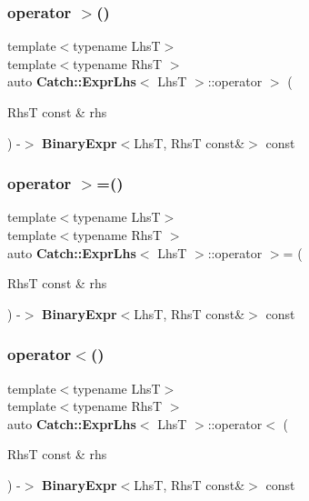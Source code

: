 \mbox{\label{class_catch_1_1_expr_lhs_af4f6dc7eeac031cfdc4fd4b78517e5b8}} 
\subsubsection{operator $>$()}
{\footnotesize\ttfamily template$<$typename LhsT$>$ \\
template$<$typename RhsT $>$ \\
auto \textbf{ Catch\+::\+Expr\+Lhs}$<$ LhsT $>$\+::operator $>$ (\begin{DoxyParamCaption}\item[{RhsT const \&}]{rhs }\end{DoxyParamCaption}) -\/$>$ \textbf{ Binary\+Expr}$<$LhsT, RhsT const\&$>$ const \hspace{0.3cm}{\ttfamily [inline]}}

\mbox{\label{class_catch_1_1_expr_lhs_a621240eaaf40e186cd96511c1d29d7b0}} 
\subsubsection{operator $>$=()}
{\footnotesize\ttfamily template$<$typename LhsT$>$ \\
template$<$typename RhsT $>$ \\
auto \textbf{ Catch\+::\+Expr\+Lhs}$<$ LhsT $>$\+::operator $>$= (\begin{DoxyParamCaption}\item[{RhsT const \&}]{rhs }\end{DoxyParamCaption}) -\/$>$ \textbf{ Binary\+Expr}$<$LhsT, RhsT const\&$>$ const \hspace{0.3cm}{\ttfamily [inline]}}

\mbox{\label{class_catch_1_1_expr_lhs_afd1ce21cb0be233a63cbdd7724adffea}} 
\subsubsection{operator$<$()}
{\footnotesize\ttfamily template$<$typename LhsT$>$ \\
template$<$typename RhsT $>$ \\
auto \textbf{ Catch\+::\+Expr\+Lhs}$<$ LhsT $>$\+::operator$<$ (\begin{DoxyParamCaption}\item[{RhsT const \&}]{rhs }\end{DoxyParamCaption}) -\/$>$ \textbf{ Binary\+Expr}$<$LhsT, RhsT const\&$>$ const \hspace{0.3cm}{\ttfamily [inline]}}

